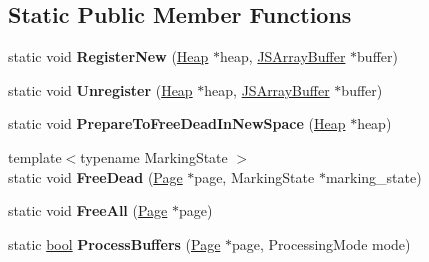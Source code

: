 \subsection*{Static Public Member Functions}
\begin{DoxyCompactItemize}
\item 
\mbox{\label{classv8_1_1internal_1_1ArrayBufferTracker_a1db25d36b9d0b80e8bbd99b50711df21}} 
static void {\bfseries Register\+New} (\mbox{\hyperlink{classv8_1_1internal_1_1Heap}{Heap}} $\ast$heap, \mbox{\hyperlink{classv8_1_1internal_1_1JSArrayBuffer}{J\+S\+Array\+Buffer}} $\ast$buffer)
\item 
\mbox{\label{classv8_1_1internal_1_1ArrayBufferTracker_a95948cf7492a22054f3c7893a79f5776}} 
static void {\bfseries Unregister} (\mbox{\hyperlink{classv8_1_1internal_1_1Heap}{Heap}} $\ast$heap, \mbox{\hyperlink{classv8_1_1internal_1_1JSArrayBuffer}{J\+S\+Array\+Buffer}} $\ast$buffer)
\item 
\mbox{\label{classv8_1_1internal_1_1ArrayBufferTracker_ac26a60156988d92f3f9bac6e5a24331d}} 
static void {\bfseries Prepare\+To\+Free\+Dead\+In\+New\+Space} (\mbox{\hyperlink{classv8_1_1internal_1_1Heap}{Heap}} $\ast$heap)
\item 
\mbox{\label{classv8_1_1internal_1_1ArrayBufferTracker_a51313b0bb008b6c02525e71c41c9915b}} 
{\footnotesize template$<$typename Marking\+State $>$ }\\static void {\bfseries Free\+Dead} (\mbox{\hyperlink{classv8_1_1internal_1_1Page}{Page}} $\ast$page, Marking\+State $\ast$marking\+\_\+state)
\item 
\mbox{\label{classv8_1_1internal_1_1ArrayBufferTracker_a9961a216eb7550bd80bb4380cf355a3a}} 
static void {\bfseries Free\+All} (\mbox{\hyperlink{classv8_1_1internal_1_1Page}{Page}} $\ast$page)
\item 
\mbox{\label{classv8_1_1internal_1_1ArrayBufferTracker_a9816ec17ae70adf20a4ebd5e0b332ac9}} 
static \mbox{\hyperlink{classbool}{bool}} {\bfseries Process\+Buffers} (\mbox{\hyperlink{classv8_1_1internal_1_1Page}{Page}} $\ast$page, Processing\+Mode mode)

\end{DoxyCompactItemize}
